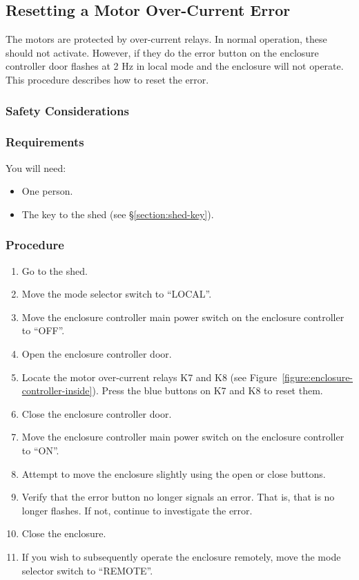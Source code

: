 \subsection{Resetting a Motor Over-Current Error}
\label{section:enclosure:reset-motot-over-current}

The motors are protected by over-current relays. In normal operation, these should not activate. However, if they do the error button on the enclosure controller door flashes at 2 Hz in local mode and the enclosure will not operate. This procedure describes how to reset the error.

\subsubsection{Safety Considerations}


\subsubsection{Requirements}

You will need:
\begin{itemize}
\item One person.
\item The key to the shed (see \S\ref{section:shed-key}).
\end{itemize}

\subsubsection{Procedure}

\begin{enumerate}
\item
Go to the shed.
\item
Move the mode selector switch to “LOCAL”.
\item
Move the enclosure controller main power switch on the enclosure controller to “OFF”.
\item
Open the enclosure controller door.
\item
Locate the motor over-current relays K7 and K8 (see Figure~\ref{figure:enclosure-controller-inside}). Press the blue buttons on K7 and K8 to reset them.
\item
Close the enclosure controller door.
\item
Move the enclosure controller main power switch on the enclosure controller to “ON”.
\item
Attempt to move the enclosure slightly using the open or close buttons.
\item
Verify that the error button no longer signals an error. That is, that is no longer flashes. If not, continue to investigate the error.
\item
Close the enclosure.
\item
If you wish to subsequently operate the enclosure remotely, move the mode selector switch to “REMOTE”.
\end{enumerate}

